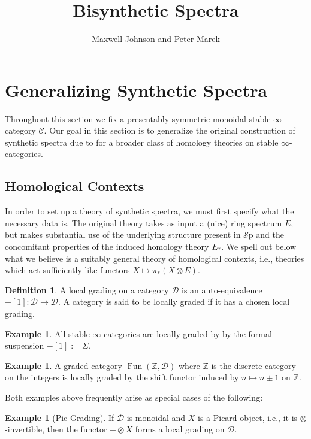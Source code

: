 \documentclass[10pt]{amsart}
\theoremstyle{definition}
\numberwithin{figure}{section}
\numberwithin{equation}{section}
\newtheorem{definition}[figure]{Definition}
\newtheorem{example}[figure]{Example}
\newcommand{\cC}{\mathcal{C}}
\newcommand{\cD}{\mathcal{D}}
\theoremstyle{cited}
\newcommand{\bZ}{\mathbb{Z}}
\newcommand{\Fun}{\operatorname{Fun}}
\newcommand{\Sp}{{\mathcal{S}\mathrm{p}}}
\begin{document}
\title{Bisynthetic Spectra}
\author{Maxwell Johnson and Peter Marek}

\maketitle

\section{Generalizing Synthetic Spectra}

Throughout this section we fix a presentably symmetric monoidal stable $\infty$-category $\cC$. Our goal in this section is to generalize the original construction of synthetic spectra due to \cite{Pst22} for a broader class of homology theories on stable $\infty$-categories.

\subsection{Homological Contexts} In order to set up a theory of synthetic spectra, we must first specify what the necessary data is. The original theory takes as input a (nice) ring spectrum $E$, but makes substantial use of the underlying structure present in $\Sp$ and the concomitant properties of the induced homology theory $E_*$. We spell out below what we believe is a suitably general theory of homological contexts, i.e., theories which act sufficiently like functors $X\mapsto \pi_*(X\otimes E)$.


\begin{definition}
  A local grading on a category $\cD$ is an auto-equivalence $-[1]:\cD\to \cD$. A category is said to be locally graded if it has a chosen local grading.
\end{definition}

\begin{example}
  All stable $\infty$-categories are locally graded by by the formal suspension $-[1]:=\Sigma$. 
\end{example}

\begin{example}
  A graded category $\Fun(\bZ,\cD)$ where $\bZ$ is the discrete category on the integers is locally graded by the shift functor induced by $n\mapsto n\pm 1$ on $\bZ$.
\end{example}

Both examples above frequently arise as special cases of the following:

\begin{example}[Pic Grading]
  If $\cD$ is monoidal and $X$ is a Picard-object, i.e., it is $\otimes$-invertible, then the functor $-\otimes X$ forms a local grading on $\cD$.
\end{example}
\end{document}
